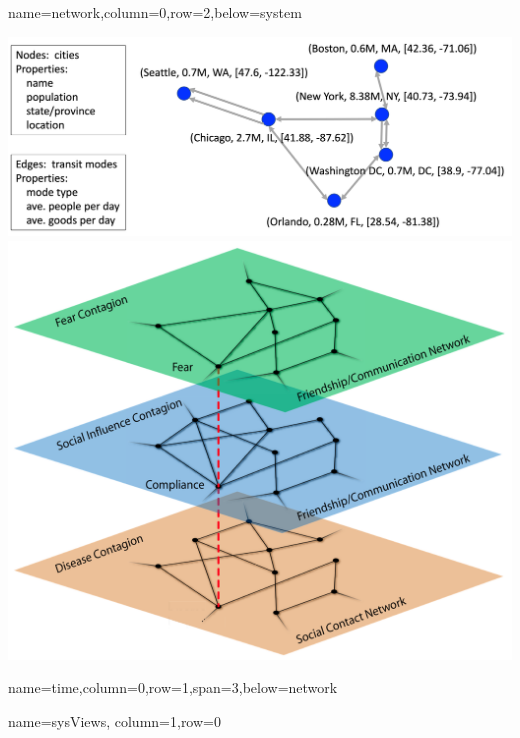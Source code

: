 \documentclass[landscape,paperwidth=70in,paperheight=46in,fontscale=0.225]{baposter} %
\begin{document}
\begin{poster}
          {name=network,column=0,row=2,below=system}{
\includegraphics[scale=0.2]{figures/single_net.png}
\includegraphics[scale=0.3]{figures/multi_net.png}

}

          {name=time,column=0,row=1,span=3,below=network}{
          
}


          {name=sysViews, column=1,row=0}{
          
}
\end{poster}
\end{document}
